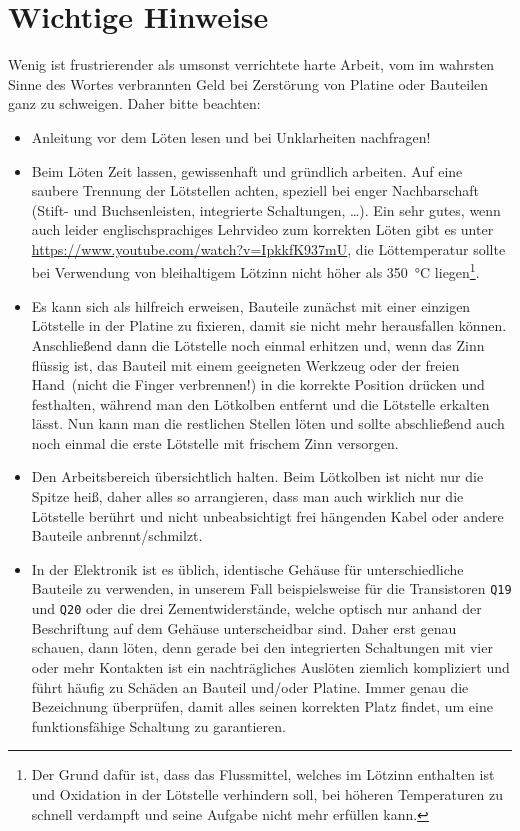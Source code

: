 \documentclass[paper=a4, open=any, numbers=noenddot]{scrbook}
\begin{document}
		\section{Wichtige Hinweise}
			Wenig ist frustrierender als umsonst verrichtete harte Arbeit, vom im wahrsten Sinne des Wortes verbrannten Geld bei Zerstörung von Platine oder Bauteilen ganz zu schweigen. Daher bitte beachten:
			\begin{itemize}
				\item Anleitung vor dem Löten lesen und bei Unklarheiten nachfragen!
				\item Beim Löten Zeit lassen, gewissenhaft und gründlich arbeiten. Auf eine saubere Trennung der Lötstellen achten, speziell bei enger Nachbarschaft (Stift- und Buchsenleisten, integrierte Schaltungen, \dots). Ein sehr gutes, wenn auch leider englischsprachiges Lehrvideo zum korrekten Löten gibt es unter \url{https://www.youtube.com/watch?v=IpkkfK937mU}, die Löttemperatur sollte bei Verwendung von bleihaltigem Lötzinn nicht höher als \SI{350}{\degreeCelsius} liegen\footnote{Der Grund dafür ist, dass das Flussmittel, welches im Lötzinn enthalten ist und Oxidation in der Lötstelle verhindern soll, bei höheren Temperaturen zu schnell verdampft und seine Aufgabe nicht mehr erfüllen kann.}.
				\item Es kann sich als hilfreich erweisen, Bauteile zunächst mit einer einzigen Lötstelle in der Platine zu fixieren, damit sie nicht mehr herausfallen können. Anschließend dann die Lötstelle noch einmal erhitzen und, wenn das Zinn flüssig ist, das Bauteil mit einem geeigneten Werkzeug oder der freien Hand~(nicht die Finger verbrennen!) in die korrekte Position drücken und festhalten, während man den Lötkolben entfernt und die Lötstelle erkalten lässt. Nun kann man die restlichen Stellen löten und sollte abschließend auch noch einmal die erste Lötstelle mit frischem Zinn versorgen.
				\item Den Arbeitsbereich übersichtlich halten. Beim Lötkolben ist nicht nur die Spitze heiß, daher alles so arrangieren, dass man auch wirklich nur die Lötstelle berührt und nicht unbeabsichtigt frei hängenden Kabel oder andere Bauteile anbrennt/schmilzt.
				\item In der Elektronik ist es üblich, identische Gehäuse für unterschiedliche Bauteile zu verwenden, in unserem Fall beispielsweise für die Transistoren \texttt{Q19} und \texttt{Q20} oder die drei Zementwiderstände, welche optisch nur anhand der Beschriftung auf dem Gehäuse unterscheidbar sind. Daher erst genau schauen, dann löten, denn gerade bei den integrierten Schaltungen mit vier oder mehr Kontakten ist ein nachträgliches Auslöten ziemlich kompliziert und führt häufig zu Schäden an Bauteil und/oder Platine. Immer genau die Bezeichnung überprüfen, damit alles seinen korrekten Platz findet, um eine funktionsfähige Schaltung zu garantieren.

\end{itemize}
\end{document}
